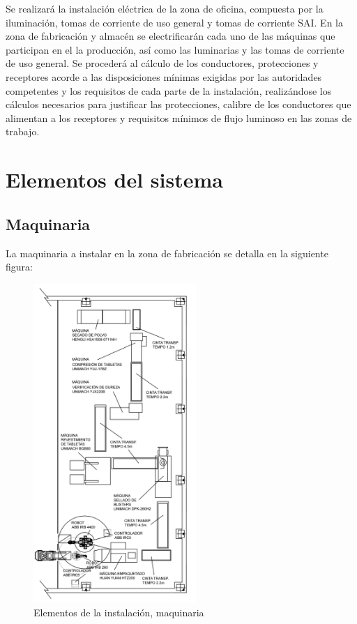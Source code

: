 Se realizará la instalación eléctrica de la zona de oficina, compuesta por la iluminación, tomas de corriente de uso general y tomas de corriente SAI. En la zona de fabricación y almacén se electrificarán cada uno de las máquinas que participan en el la producción, así como las luminarias y las tomas de corriente de uso general. Se procederá al cálculo de los conductores, protecciones y receptores acorde a las disposiciones mínimas exigidas por las autoridades competentes y los requisitos de cada parte de la instalación, realizándose los cálculos necesarios para justificar las protecciones, calibre de los conductores que alimentan a los receptores y requisitos mínimos de flujo luminoso en las zonas de trabajo.

\pagebreak

\section{Elementos del sistema}
\subsection{Maquinaria}

La maquinaria a instalar en la zona de fabricación se detalla en la siguiente figura: 

\begin{figure}[htp]
			\centering
			\includegraphics[width=0.55\textwidth]{Memoria/planta_maquinas.png}
			\caption{Elementos de la instalación, maquinaria}
			\label{fig:testb}
	\end{figure}

